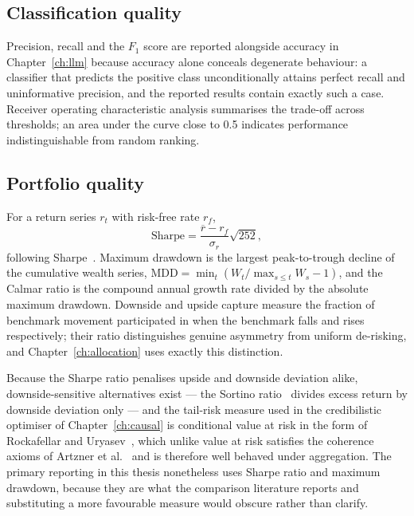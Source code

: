 \subsection{Classification quality}

Precision, recall and the $F_1$ score are reported alongside accuracy in
Chapter~\ref{ch:llm} because accuracy alone conceals degenerate behaviour: a classifier that
predicts the positive class unconditionally attains perfect recall and uninformative precision,
and the reported results contain exactly such a case. Receiver operating characteristic analysis
summarises the trade-off across thresholds; an area under the curve close to 0.5 indicates
performance indistinguishable from random ranking.

\subsection{Portfolio quality}

For a return series $r_t$ with risk-free rate $r_f$,
\begin{equation}
\mathrm{Sharpe} = \frac{\overline{r} - r_f}{\sigma_r}\sqrt{252},
\end{equation}
following Sharpe~\cite{sharpe1966}. Maximum drawdown is the largest peak-to-trough decline of the
cumulative wealth series, $\mathrm{MDD} = \min_t ( W_t / \max_{s \le t} W_s - 1 )$, and the Calmar
ratio is the compound annual growth rate divided by the absolute maximum drawdown. Downside and
upside capture measure the fraction of benchmark movement participated in when the benchmark
falls and rises respectively; their ratio distinguishes genuine asymmetry from uniform
de-risking, and Chapter~\ref{ch:allocation} uses exactly this distinction.

Because the Sharpe ratio penalises upside and downside deviation alike, downside-sensitive
alternatives exist --- the Sortino ratio~\cite{sortino1994} divides excess return by downside
deviation only --- and the tail-risk measure used in the credibilistic optimiser of
Chapter~\ref{ch:causal} is conditional value at risk in the form of Rockafellar and
Uryasev~\cite{rockafellar2000}, which unlike value at risk satisfies the coherence axioms of
Artzner et al.~\cite{artzner1999} and is therefore well behaved under aggregation. The primary
reporting in this thesis nonetheless uses Sharpe ratio and maximum drawdown, because they are
what the comparison literature reports and substituting a more favourable measure would obscure
rather than clarify.


